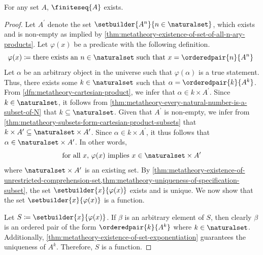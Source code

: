 \begin{thm}
     \label{thm:metatheory-existence-of-the-set-of-all-finite-sequences}
    For any set \( A \), \( \finiteseq{A} \) exists.
\end{thm}

\begin{proof}
    Let \( A^{\prime} \) denote the set \( \setbuilder{A^{n}}{n \in \naturalset} \), which exists and is non-empty as implied by 
    \cref{thm:metatheory-existence-of-set-of-all-n-ary-products}.
    Let \( \varphi(x) \) be a predicate with the following definition.
    \begin{equation*}
        \varphi(x) \coloneq \text{there exists an \( n \in \naturalset \) such that \( x = \orderedpair{n}{A^{n}} \) }
    \end{equation*}
    Let \( \alpha \) be an arbitrary object in the universe such that \( \varphi(\alpha) \) is a true statement.
    Thus, there exists some \( k \in \naturalset \) such that \( \alpha = \orderedpair{k}{A^{k}} \).
    From \cref{dfn:metatheory-cartesian-product}, we infer that \( \alpha \in k \times A^{\prime} \).
    Since \( k \in \naturalset \), it follows from \cref{thm:metatheory-every-natural-number-is-a-subset-of-N} that \( k \subseteq \naturalset \).
    Given that \( A^{\prime} \) is non-empty, we infer from \cref{thm:metatheory-subsets-form-cartesian-product-subsets} that
    \( k \times A^{\prime} \subseteq \naturalset \times A^{\prime} \).
    Since \( \alpha \in k \times A^{\prime} \), it thus follows that \( \alpha \in \naturalset \times A^{\prime} \).
    In other words,
    \begin{equation*}
        \text{for all \( x \), \( \varphi(x) \) implies \( x \in \naturalset \times A^{\prime} \)}
    \end{equation*}
    where \( \naturalset \times A^{\prime} \) is an existing set.
    By \cref{thm:metatheory-existence-of-unrestricted-comprehension-set,thm:metatheory-uniqueness-of-specification-subset},
    the set \( \setbuilder{x}{\varphi(x)} \) exists and is unique.
    We now show that the set \( \setbuilder{x}{\varphi(x)} \) is a function.

    \vspace{0.3cm}
    \noindent
    Let \( S \coloneq \setbuilder{x}{\varphi(x)} \).
    If \( \beta \) is an arbitrary element of \( S \), then clearly \( \beta \) is an ordered pair of the form \( \orderedpair{k}{A^{k}} \) where \( k \in \naturalset \).
    Additionally, \cref{thm:metatheory-existence-of-set-exponentiation} guarantees the uniqueness of \( A^{k} \).
    Therefore, \( S \) is a function.


\end{proof}
